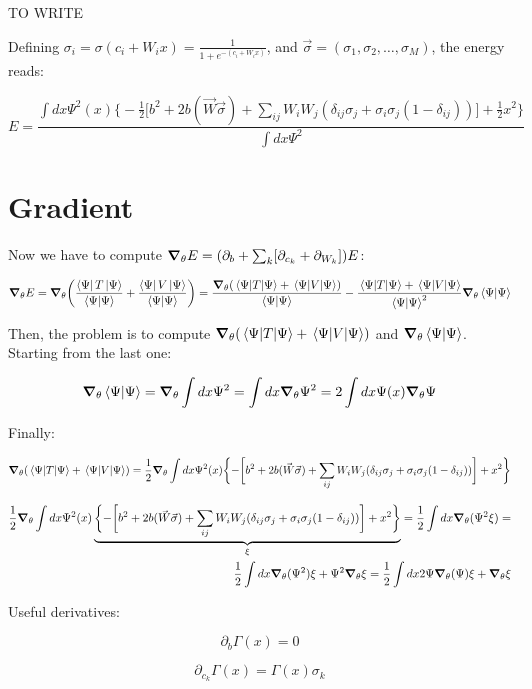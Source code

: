 \documentclass{book}
\begin{document}
TO WRITE

Defining $\sigma_i=\sigma(c_i+W_i x) = \frac{1}{1+e^{-(c_i+W_i x)}}$, and $\vec{\sigma}=(\sigma_1,\sigma_2,\dots,\sigma_M)$, the energy reads:

\[E=\frac{\int dx \Psi^2(x)\biggl\{-\frac{1}{2}\biggl[b^2+2b(\vec{W}\vec{\sigma})+\sum_{ij}W_iW_j(\delta_{ij}\sigma_j+\sigma_i\sigma_j(1-\delta_{ij}))\biggr]+\frac{1}{2}x^2\biggr\}}{\int dx \Psi^2}\]

\section{Gradient}

Now we have to compute $\grad_\theta E=(\partial_b+\sum_k[\partial_{c_k}+\partial_{W_k}])E$:

\[\grad_\theta E=\grad_\theta \bigg(\frac{\bra{\Psi}T\ket{\Psi}}{\bra{\Psi}\ket{\Psi}}+\frac{\bra{\Psi}V\ket{\Psi}}{\bra{\Psi}\ket{\Psi}}\bigg)=\frac{\grad_\theta(\ev{T}{\Psi}+\ev{V}{\Psi})}{\braket{\Psi}{\Psi}}-\frac{\ev{T}{\Psi}+\ev{V}{\Psi}}{\braket{\Psi}{\Psi}^2}\grad_\theta\braket{\Psi}{\Psi}\]

Then, the problem is to compute $\grad_\theta(\ev{T}{\Psi}+\ev{V}{\Psi})$ and $\grad_\theta\braket{\Psi}{\Psi}$. Starting from the last one:

\[\grad_\theta\braket{\Psi}{\Psi}=\grad_\theta\int dx\Psi^2=\int dx\grad_\theta\Psi^2=2\int dx \Psi(x)\grad_\theta \Psi\]

Finally:

\[\grad_\theta(\ev{T}{\Psi}+\ev{V}{\Psi})=\frac{1}{2}\grad_\theta \int dx \Psi^2(x)\biggl\{-\biggl[b^2+2b(\vec{W}\vec{\sigma})+\sum_{ij}W_iW_j(\delta_{ij}\sigma_j+\sigma_i\sigma_j(1-\delta_{ij}))\biggr]+x^2\biggr\}\]

\begin{align*}
    \frac{1}{2}\grad_\theta \int dx \Psi^2(x)\underbrace{\biggl\{-\biggl[b^2+2b(\vec{W}\vec{\sigma})+\sum_{ij}W_iW_j(\delta_{ij}\sigma_j+\sigma_i\sigma_j(1-\delta_{ij}))\biggr]+x^2\biggr\}}_\xi=\frac{1}{2}\int dx \grad_\theta (\Psi^2 \xi)=\\
    \frac{1}{2}\int dx\grad_\theta (\Psi ^2)\xi+\Psi^2\grad_\theta \xi=\frac{1}{2}\int dx 2\Psi\grad_\theta(\Psi)\xi+\grad_\theta \xi
\end{align*}

Useful derivatives:

\[\partial_b\Gamma(x)=0\]

\[\partial_{c_k}\Gamma(x)=\Gamma(x)\sigma_k\]
\end{document}

